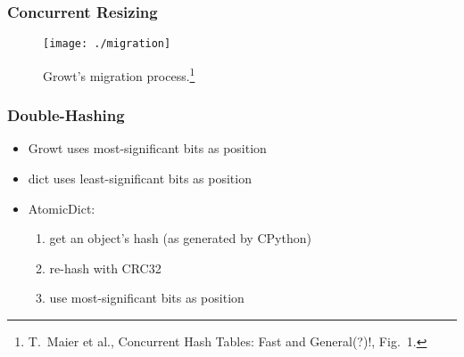 \documentclass[aspectratio=169]{beamer}
\begin{document}
\begin{frame}
    \frametitle{Concurrent Resizing}

    \begin{figure}
        \centering\texttt{[image: ./migration]}
        \caption{Growt's migration process.\footnote{%
            T.\ Maier et al., Concurrent Hash Tables: Fast and General(?)!, Fig.~1.
        }}\label{fig:maier-migration}
    \end{figure}
\end{frame}

\begin{frame}
    \frametitle{Double-Hashing}

    \begin{itemize}
        \item Growt uses most-significant bits as position
        \item dict uses least-significant bits as position
        \item<2-> AtomicDict:
        \begin{enumerate}
            \item<3-> get an object's hash (as generated by CPython)
            \item<4-> re-hash with CRC32
            \item<5-> use most-significant bits as position
        \end{enumerate}
    \end{itemize}
\end{frame}
\end{document}

